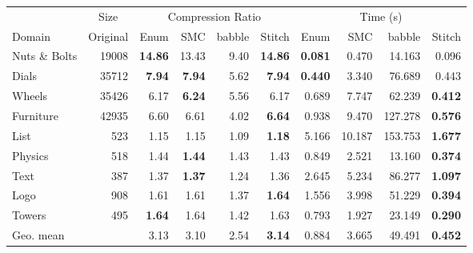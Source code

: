 \begin{tabular}{l r  rrrr rrrr}
\toprule
& \multicolumn{1}{c}{Size} & \multicolumn{4}{c}{Compression Ratio} & \multicolumn{4}{c}{Time (s)} \\
\cmidrule(lr){2-2} \cmidrule(lr){3-6} \cmidrule(lr){7-10}
Domain & Original & Enum & SMC & babble & Stitch & Enum & SMC & babble & Stitch \\
\midrule
Nuts \& Bolts & 19008 & \textbf{14.86} & 13.43 & 9.40 & \textbf{14.86} & \textbf{0.081} & 0.470 & 14.163 & 0.096 \\
Dials & 35712 & \textbf{7.94} & \textbf{7.94} & 5.62 & \textbf{7.94} & \textbf{0.440} & 3.340 & 76.689 & 0.443 \\
Wheels & 35426 & 6.17 & \textbf{6.24} & 5.56 & 6.17 & 0.689 & 7.747 & 62.239 & \textbf{0.412} \\
Furniture & 42935 & 6.60 & 6.61 & 4.02 & \textbf{6.64} & 0.938 & 9.470 & 127.278 & \textbf{0.576} \\
List & 523 & 1.15 & 1.15 & 1.09 & \textbf{1.18} & 5.166 & 10.187 & 153.753 & \textbf{1.677} \\
Physics & 518 & 1.44 & \textbf{1.44} & 1.43 & 1.43 & 0.849 & 2.521 & 13.160 & \textbf{0.374} \\
Text & 387 & 1.37 & \textbf{1.37} & 1.24 & 1.36 & 2.645 & 5.234 & 86.277 & \textbf{1.097} \\
Logo & 908 & 1.61 & 1.61 & 1.37 & \textbf{1.64} & 1.556 & 3.998 & 51.229 & \textbf{0.394} \\
Towers & 495 & \textbf{1.64} & 1.64 & 1.42 & 1.63 & 0.793 & 1.927 & 23.149 & \textbf{0.290} \\
\midrule
Geo. mean &  & 3.13 & 3.10 & 2.54 & \textbf{3.14} & 0.884 & 3.665 & 49.491 & \textbf{0.452} \\
\bottomrule
\end{tabular}
